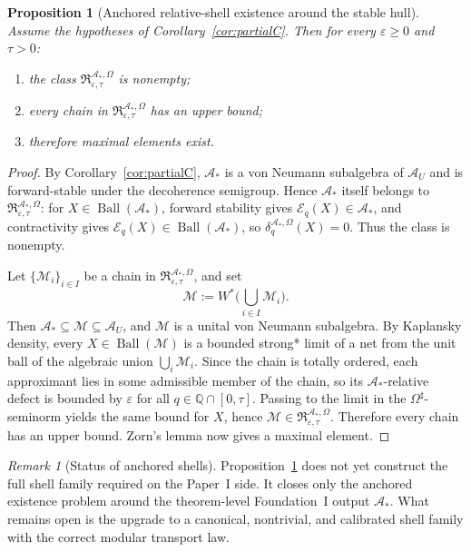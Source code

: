 \documentclass[12pt]{article}
\newtheorem{proposition}[theorem]{Proposition}
\theoremstyle{definition}
\theoremstyle{remark}
\newtheorem{remark}[theorem]{Remark}
\begin{document}
\begin{proposition}[Anchored relative-shell existence around the stable hull]\label{prop:anchored_shell}
Assume the hypotheses of Corollary~\ref{cor:partialC}. Then for every
\(\varepsilon\ge 0\) and \(\tau>0\):
\begin{enumerate}
\item the class
  \(\mathfrak R_{\varepsilon,\tau}^{\mathcal A_*,\Omega}\) is
  nonempty;
\item every chain in
  \(\mathfrak R_{\varepsilon,\tau}^{\mathcal A_*,\Omega}\) has an
  upper bound;
\item therefore maximal elements exist.
\end{enumerate}
\end{proposition}

\begin{proof}
By Corollary~\ref{cor:partialC}, \(\mathcal A_*\) is a von Neumann
subalgebra of \(\mathcal A_U\) and is forward-stable under the
decoherence semigroup. Hence \(\mathcal A_*\) itself belongs to
\(\mathfrak R_{\varepsilon,\tau}^{\mathcal A_*,\Omega}\): for
\(X\in\operatorname{Ball}(\mathcal A_*)\), forward stability gives
\(\mathcal E_q(X)\in\mathcal A_*\), and contractivity gives
\(\mathcal E_q(X)\in\operatorname{Ball}(\mathcal A_*)\), so
\(\delta_q^{\mathcal A_*,\Omega}(X)=0\). Thus the class is nonempty.

Let \(\{\mathcal M_i\}_{i\in I}\) be a chain in
\(\mathfrak R_{\varepsilon,\tau}^{\mathcal A_*,\Omega}\), and set
\[
\mathcal M:=W^*\!\Big(\bigcup_{i\in I}\mathcal M_i\Big).
\]
Then \(\mathcal A_*\subseteq \mathcal M\subseteq \mathcal A_U\), and
\(\mathcal M\) is a unital von Neumann subalgebra. By Kaplansky
density, every \(X\in\operatorname{Ball}(\mathcal M)\) is a bounded
strong* limit of a net from the unit ball of the algebraic union
\(\bigcup_i\mathcal M_i\). Since the chain is totally ordered, each
approximant lies in some admissible member of the chain, so its
\(\mathcal A_*\)-relative defect is bounded by \(\varepsilon\) for all
\(q\in\mathbb Q\cap[0,\tau]\). Passing to the limit in the
\(\Omega^\sharp\)-seminorm yields the same bound for \(X\), hence
\(\mathcal M\in\mathfrak R_{\varepsilon,\tau}^{\mathcal A_*,\Omega}\).
Therefore every chain has an upper bound. Zorn's lemma now gives a
maximal element.
\end{proof}

\begin{remark}[Status of anchored shells]\label{rem:anchored_shell_status}
Proposition~\ref{prop:anchored_shell} does not yet construct the full
shell family required on the Paper~I side. It closes only the anchored
existence problem around the theorem-level Foundation~I output
\(\mathcal A_*\). What remains open is the upgrade to a canonical,
nontrivial, and calibrated shell family with the correct modular
transport law.
\end{remark}
\end{document}
